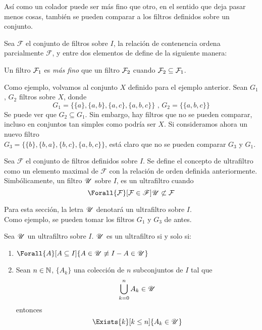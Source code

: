 Así como un colador puede ser más fino que otro, en el sentido que
deja pasar menos cosas, también se pueden comparar a los filtros definidos
sobre un conjunto.

\begin{definition}
  Sea $\mathscr{F}$ el conjunto de filtros sobre $I$, la relación de contenencia
  ordena parcialmente $\mathscr{F}$, y entre dos elementos de define de la siguiente
  manera:

  Un filtro $\mathcal{F}_1$ es \emph{más fino} que un filtro $\mathcal{F}_2$ cuando $\mathcal{F}_2 \subseteq \mathcal{F}_1$.
\end{definition}

Como ejemplo, volvamos al conjunto $X$ definido para el ejemplo anterior. Sean $G_1$, $G_2$
filtros sobre $X$, donde
\[G_1 = \{\{a\}, \{a,b\},\{a,c\},\{a,b,c\}\}\text{ , } G_2 = \{\{a,b,c\}\}\]
Se puede ver que $G_2 \subseteq G_1$. Sin embargo, hay filtros que no
se pueden comparar, incluso en conjuntos tan simples como podría ser
$X$. Si consideramos ahora un nuevo filtro\\
$G_3 = \{\{b\}, \{b,a\},\{b,c\},\{a,b,c\}\}$, está claro que no se pueden comparar
$G_3$ y $G_1$.

\begin{definition}
  Sea $\mathscr{F}$ el conjunto de filtros definidos sobre $I$. Se define
  el concepto de ultrafiltro como un elemento maximal de $\mathscr{F}$ con
  la relación de orden definida anteriormente. Simbólicamente,
  un filtro $\mathscr{U}$ sobre $I$, es un ultrafiltro cuando
  \[\Forall{\F}[\F\in\mathscr{F}]{\U\not\subset\F}\]

  Para esta sección, la letra $\mathscr{U}$ denotará un ultrafiltro sobre $I$.\\
  Como ejemplo, se pueden tomar los filtros $G_1$ y $G_3$ de antes.
\end{definition}


\begin{theorem}[Caracterizaciones]
  Sea $\mathscr{U}$ un ultrafiltro sobre $I$. $\mathscr{U}$ es un ultrafiltro si y solo si:
  \begin{enumerate}
    \item $\Forall{A}[A\subseteq I]{A\in\U \not\equiv I-A \in \U}$
    \item Sean $n\in\mathbb{N}$, $\{A_k\}$ una colección de $n$ subconjuntos de $I$ tal que
          \[\bigcup_{k=0}^n A_k \in \mathscr{U}\]
          entonces
          \[\Exists{k}[k\leq n]{A_k\in\U}\]
  \end{enumerate}
\end{theorem}

